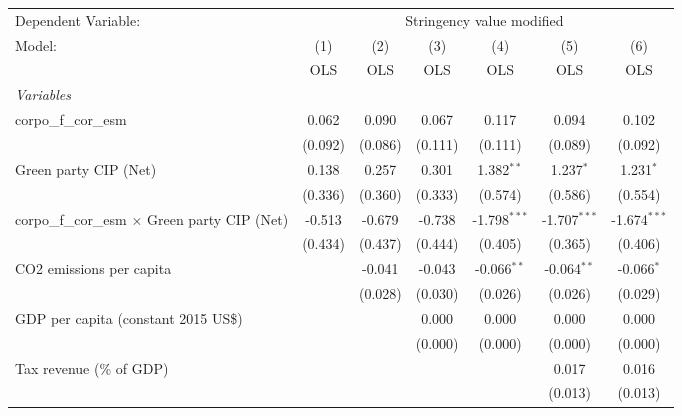 
\begingroup
\centering
\begin{tabular}{lcccccc}
   \toprule
   Dependent Variable: & \multicolumn{6}{c}{Stringency value modified}\\
   Model:                                                & (1)     & (2)     & (3)     & (4)            & (5)            & (6)\\  
                                                         &  OLS    & OLS     & OLS     & OLS            & OLS            & OLS\\  
   \midrule
   \emph{Variables}\\
   corpo\_f\_cor\_esm                                    & 0.062   & 0.090   & 0.067   & 0.117          & 0.094          & 0.102\\   
                                                         & (0.092) & (0.086) & (0.111) & (0.111)        & (0.089)        & (0.092)\\   
   Green party CIP (Net)                                 & 0.138   & 0.257   & 0.301   & 1.382$^{**}$   & 1.237$^{*}$    & 1.231$^{*}$\\   
                                                         & (0.336) & (0.360) & (0.333) & (0.574)        & (0.586)        & (0.554)\\   
   corpo\_f\_cor\_esm $\times$ Green party CIP (Net)     & -0.513  & -0.679  & -0.738  & -1.798$^{***}$ & -1.707$^{***}$ & -1.674$^{***}$\\   
                                                         & (0.434) & (0.437) & (0.444) & (0.405)        & (0.365)        & (0.406)\\   
   CO2 emissions per capita                              &         & -0.041  & -0.043  & -0.066$^{**}$  & -0.064$^{**}$  & -0.066$^{*}$\\   
                                                         &         & (0.028) & (0.030) & (0.026)        & (0.026)        & (0.029)\\   
   GDP per capita (constant 2015 US\$)                   &         &         & 0.000   & 0.000          & 0.000          & 0.000\\   
                                                         &         &         & (0.000) & (0.000)        & (0.000)        & (0.000)\\   
   Tax revenue (\% of GDP)                               &         &         &         &                & 0.017          & 0.016\\   
                                                         &         &         &         &                & (0.013)        & (0.013)\\   

\end{tabular}
